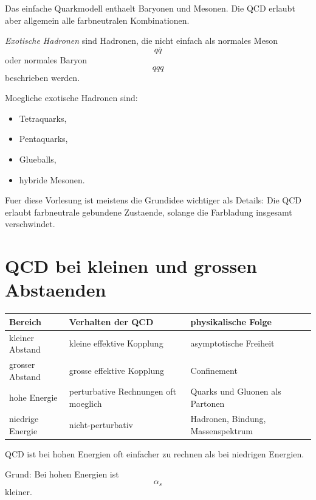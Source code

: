 Das einfache Quarkmodell enthaelt Baryonen und Mesonen.
Die QCD erlaubt aber allgemein alle farbneutralen Kombinationen.

\begin{definitionbox}
\emph{Exotische Hadronen} sind Hadronen, die nicht einfach als normales Meson
\[
    q\overline{q}
\]
oder normales Baryon
\[
    qqq
\]
beschrieben werden.
\end{definitionbox}

\begin{conceptbox}
Moegliche exotische Hadronen sind:
\begin{itemize}
    \item Tetraquarks,
    \item Pentaquarks,
    \item Glueballs,
    \item hybride Mesonen.
\end{itemize}
\end{conceptbox}

\begin{notebox}
Fuer diese Vorlesung ist meistens die Grundidee wichtiger als Details:
Die QCD erlaubt farbneutrale gebundene Zustaende, solange die Farbladung insgesamt
verschwindet.
\end{notebox}

\section{QCD bei kleinen und grossen Abstaenden}

\begin{center}
\begin{tabular}{|p{4.2cm}|p{5.0cm}|p{5.0cm}|}
\hline
Bereich & Verhalten der QCD & physikalische Folge \\
\hline
kleiner Abstand & kleine effektive Kopplung & asymptotische Freiheit \\
\hline
grosser Abstand & grosse effektive Kopplung & Confinement \\
\hline
hohe Energie & perturbative Rechnungen oft moeglich & Quarks und Gluonen als Partonen \\
\hline
niedrige Energie & nicht-perturbativ & Hadronen, Bindung, Massenspektrum \\
\hline
\end{tabular}
\end{center}

\begin{examtipbox}
QCD ist bei hohen Energien oft einfacher zu rechnen als bei niedrigen Energien.

Grund:
Bei hohen Energien ist
\[
    \alpha_s
\]
kleiner.
\end{examtipbox}

